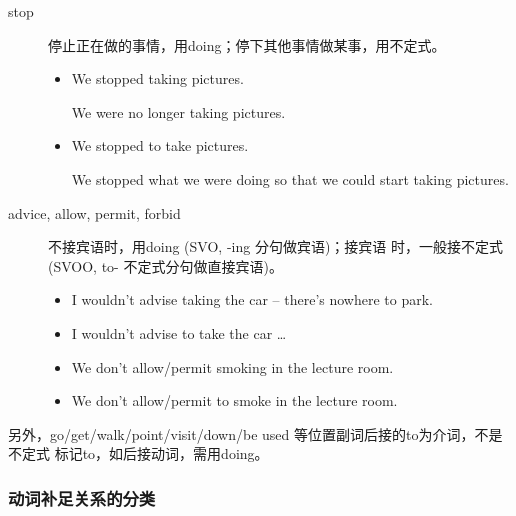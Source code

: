 \begin{description}
\item[stop] 停止正在做的事情，用doing；停下其他事情做某事，用不定式。
  \begin{itemize}
  \item We stopped taking pictures.

    We were no longer taking pictures.


  \item We stopped to take pictures.

    We stopped what we were doing so that we could start taking pictures.
  \end{itemize}

\item[advice, allow, permit, forbid] 不接宾语时，用doing (SVO, -ing 分句做宾语)；接宾语
  时，一般接不定式 (SVOO, to- 不定式分句做直接宾语)。
  \begin{itemize}
  \item I wouldn't advise taking the car – there's nowhere to park.
  \item I wouldn't advise  to take the car …
  \item We don't allow/permit smoking in the lecture room.
  \item We don't allow/permit  to smoke in the lecture room.
  \end{itemize}
\end{description}

另外，go/get/walk/point/visit/down/be used 等位置副词后接的to为介词，不是不定式
标记to，如后接动词，需用doing。

\subsubsection{动词补足关系的分类}

